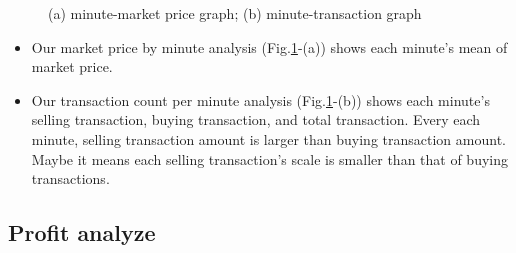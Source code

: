 \documentclass[conference]{IEEEtran}
\begin{document}
\begin{figure}[htbp]
\centering
{}
\caption{(a) minute-market price graph; (b) minute-transaction graph}
\label{fig:minute}
\vspace{-0.5cm}
\end{figure}

\begin{itemize}
\item Our market price by minute analysis (Fig.\ref{fig:minute}-(a)) shows each minute's mean of market price. 
\item Our transaction count per minute analysis (Fig.\ref{fig:minute}-(b)) shows each minute's selling transaction, buying transaction, and total transaction. Every each minute, selling transaction amount is larger than buying transaction amount. Maybe it means each selling transaction's scale is smaller than that of buying transactions.
\end{itemize}

\subsection{Profit analyze}
\end{document}
